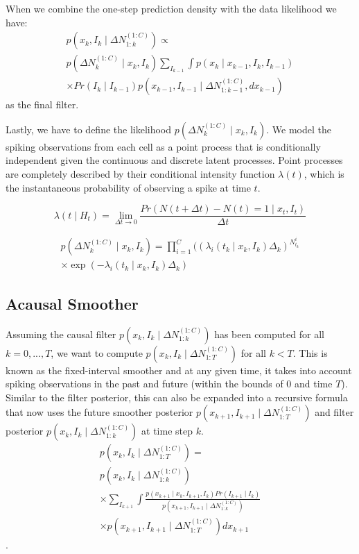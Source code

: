 \documentclass[conference]{IEEEtran}
\begin{document}
When we combine the one-step prediction density with the data likelihood we have:
\begin{multline}
p(x_{k}, I_{k} \mid \Delta N_{1:k}^{(1:C)}) \propto \\
p(\Delta N_{k}^{(1:C)}  \mid x_{k}, I_{k}) \sum_{I_{k-1}} \int p(x_{k} \mid x_{k-1}, I_{k}, I_{k-1}) \\
\times Pr(I_{k} \mid I_{k-1}) p(x_{k-1}, I_{k-1} \mid \Delta N_{1:k-1}^{(1:C)}, dx_{k-1})
\end{multline}
as the final filter.

Lastly, we have to define the likelihood $p(\Delta N_{k}^{(1:C)} \mid x_{k}, I_{k})$. We model the spiking observations from each cell as a point process that is conditionally independent given the continuous and discrete latent processes. Point processes are completely described by their conditional intensity function $\lambda(t)$, which is the instantaneous probability of observing a spike at time $t$.

\begin{equation}
    \lambda(t \mid H_{t}) = \lim_{\Delta t \rightarrow{0}} \frac{Pr(N(t + \Delta t) - N(t) = 1 \mid x_{t}, I_{t})}{\Delta t}
\end{equation}


\begin{multline}
    p(\Delta N_{k}^{(1:C)} \mid x_{k}, I_{k}) = \prod^{C}_{i=1} ((\lambda_{i}(t_{k} \mid x_{k}, I_{k})\Delta_{k})^{N_{t_{k}}^{i}} \\
    \times \exp(-\lambda_{i}(t_{k} \mid x_{k}, I_{k})\Delta_{k})
\end{multline}

\subsection{Acausal Smoother}
Assuming the causal filter $p(x_{k}, I_{k} \mid \Delta N_{1:k}^{(1:C)})$ has been computed for all $k = 0, ..., T$, we want to compute $p(x_{k}, I_{k} \mid \Delta N_{1:T}^{(1:C)})$ for all $k < T$. This is known as the fixed-interval smoother and at any given time, it takes into account spiking observations in the past and future (within the bounds of 0 and time $T$). Similar to the filter posterior, this can also be expanded into a recursive formula that now uses the future smoother posterior $p(x_{k+1}, I_{k+1} \mid \Delta N_{1:T}^{(1:C)})$ and filter posterior $p(x_{k}, I_{k} \mid \Delta N_{1:k}^{(1:C)})$ at time step $k$.
\begin{multline}
p(x_{k}, I_{k} \mid \Delta N_{1:T}^{(1:C)}) = \\
p(x_{k}, I_{k} \mid \Delta N_{1:k}^{(1:C)}) \\
\times \sum_{I_{k+1}} \int \frac{p(x_{k+1} \mid x_{k}, I_{k+1}, I_{k})
Pr(I_{k+1} \mid I_{k})}{p(x_{k+1}, I_{k+1} \mid \Delta N_{1:k}^{(1:C)})} \\
\times p(x_{k+1}, I_{k+1} \mid \Delta N_{1:T}^{(1:C)}) dx_{k+1}
\end{multline}.
\end{document}
